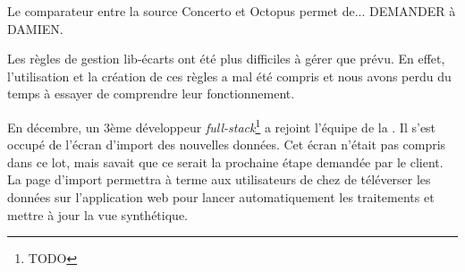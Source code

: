 Le comparateur entre la source Concerto et Octopus permet de... DEMANDER à DAMIEN.

Les règles de gestion lib-écarts ont été plus difficiles à gérer que prévu. En effet, l'utilisation et la création de ces règles a mal été compris et nous avons perdu du temps à essayer de comprendre leur fonctionnement.

En décembre, un 3ème développeur \textit{full-stack}\footnote{TODO} a rejoint l'équipe de la \df. Il s'est occupé de l'écran d'import des nouvelles données. Cet écran n'était pas compris dans ce lot, mais \damien savait que ce serait la prochaine étape demandée par le client. La page d'import permettra à terme aux utilisateurs de chez \sncf de téléverser les données sur l'application web pour lancer automatiquement les traitements et mettre à jour la vue synthétique.



